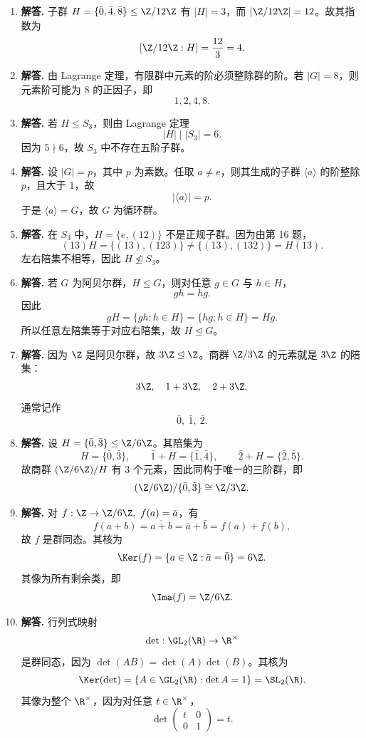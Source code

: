 \begin{enumerate}[label=\textbf{\arabic*.}, leftmargin=*, itemsep=1em]
\item \textbf{解答.} 子群 $H=\{\bar0,\bar4,\bar8\}\le \Z/12\Z$ 有 $|H|=3$，而 $|\Z/12\Z|=12$。故其指数为
\[
[\Z/12\Z:H]=\frac{12}{3}=4.
\]

\item \textbf{解答.} 由 Lagrange 定理，有限群中元素的阶必须整除群的阶。若 $|G|=8$，则元素阶可能为 $8$ 的正因子，即
\[
1,2,4,8.
\]

\item \textbf{解答.} 若 $H\le S_3$，则由 Lagrange 定理
\[
|H|\mid |S_3|=6.
\]
因为 $5\nmid6$，故 $S_3$ 中不存在五阶子群。

\item \textbf{解答.} 设 $|G|=p$，其中 $p$ 为素数。任取 $a\neq e$，则其生成的子群 $\langle a\rangle$ 的阶整除 $p$，且大于 $1$，故
\[
|\langle a\rangle|=p.
\]
于是 $\langle a\rangle=G$，故 $G$ 为循环群。

\item \textbf{解答.} 在 $S_3$ 中，$H=\{e,(12)\}$ 不是正规子群。因为由第 16 题，
\[
(13)H=\{(13),(123)\}\neq \{(13),(132)\}=H(13).
\]
左右陪集不相等，因此 $H\not\trianglelefteq S_3$。

\item \textbf{解答.} 若 $G$ 为阿贝尔群，$H\le G$，则对任意 $g\in G$ 与 $h\in H$，
\[
gh=hg.
\]
因此
\[
gH=\{gh:h\in H\}=\{hg:h\in H\}=Hg.
\]
所以任意左陪集等于对应右陪集，故 $H\trianglelefteq G$。

\item \textbf{解答.} 因为 $\Z$ 是阿贝尔群，故 $3\Z\trianglelefteq \Z$。商群 $\Z/3\Z$ 的元素就是 $3\Z$ 的陪集：
\[
3\Z,\quad 1+3\Z,\quad 2+3\Z.
\]
通常记作
\[
\bar0,\ \bar1,\ \bar2.
\]

\item \textbf{解答.} 设 $H=\{\bar0,\bar3\}\le \Z/6\Z$。其陪集为
\[
H=\{\bar0,\bar3\},\qquad \bar1+H=\{\bar1,\bar4\},\qquad \bar2+H=\{\bar2,\bar5\}.
\]
故商群 $(\Z/6\Z)/H$ 有 $3$ 个元素，因此同构于唯一的三阶群，即
\[
(\Z/6\Z)/\{\bar0,\bar3\}\cong \Z/3\Z.
\]

\item \textbf{解答.} 对 $f:\Z\to \Z/6\Z,\ f(a)=\bar a$，有
\[
f(a+b)=\overline{a+b}=\bar a+\bar b=f(a)+f(b),
\]
故 $f$ 是群同态。其核为
\[
\Ker(f)=\{a\in\Z:\bar a=\bar0\}=6\Z.
\]
其像为所有剩余类，即
\[
\Ima(f)=\Z/6\Z.
\]

\item \textbf{解答.} 行列式映射
\[
\det:\GL_2(\R)\to \R^\times
\]
是群同态，因为 $\det(AB)=\det(A)\det(B)$。其核为
\[
\Ker(\det)=\{A\in \GL_2(\R):\det A=1\}=\SL_2(\R).
\]
其像为整个 $\R^\times$，因为对任意 $t\in\R^\times$，
\[
\det\begin{pmatrix} t&0\\0&1\end{pmatrix}=t.
\]


\end{enumerate}
